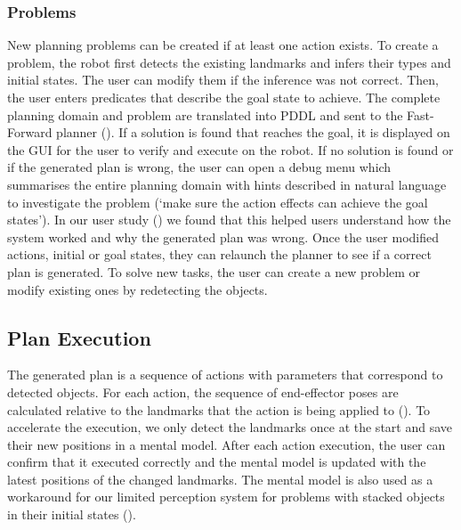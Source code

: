 \subsubsection{Problems} New planning problems can be created if at least one action exists.
To create a problem, the robot first detects the existing landmarks and infers their types and initial states.
The user can modify them if the inference was not correct.
Then, the user enters predicates that describe the goal state to achieve.
The complete planning domain and problem are translated into PDDL and sent to the Fast-Forward planner (\cite{hoffmann2001ff}).
If a solution is found that reaches the goal, it is displayed on the GUI for the user to verify and execute on the robot.
If no solution is found or if the generated plan is wrong, the user can open a debug menu which summarises the entire planning domain with hints described in natural language to investigate the problem (\eg `make sure the action effects can achieve the goal states').
In our user study () we found that this helped users understand how the system worked and why the generated plan was wrong.
Once the user modified actions, initial or goal states, they can relaunch the planner to see if a correct plan is generated.
To solve new tasks, the user can create a new problem or modify existing ones by redetecting the objects.

\subsection{Plan Execution} 
The generated plan is a sequence of actions with parameters that correspond to detected objects.
For each action, the sequence of end-effector poses are calculated relative to the landmarks that the action is being applied to ().
To accelerate the execution, we only detect the landmarks once at the start and save their new positions in a mental model.
After each action execution, the user can confirm that it executed correctly and the mental model is updated with the latest positions of the changed landmarks.
The mental model is also used as a workaround for our limited perception system for problems with stacked objects in their initial states ().


